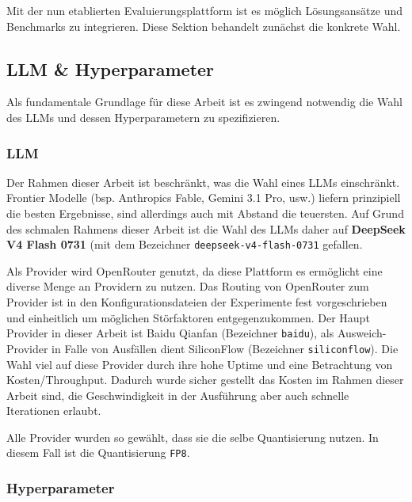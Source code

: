 Mit der nun etablierten Evaluierungsplattform ist es möglich Lösungsansätze und Benchmarks zu integrieren. Diese Sektion behandelt zunächst die konkrete Wahl.



\subsection{LLM \& Hyperparameter}\label{ch:Versuchsaufbau:LLMs}

Als fundamentale Grundlage für diese Arbeit ist es zwingend notwendig die Wahl des LLMs und dessen Hyperparametern zu spezifizieren. 

\subsubsection{LLM}\label{ch:Versuchsaufbau:LLMs:LLM}

Der Rahmen dieser Arbeit ist beschränkt, was die Wahl eines LLMs einschränkt. Frontier Modelle (bsp. Anthropics Fable, Gemini 3.1 Pro, usw.) liefern prinzipiell die besten Ergebnisse, sind allerdings auch mit Abstand die teuersten. Auf Grund des schmalen Rahmens dieser Arbeit ist die Wahl des LLMs daher auf \textbf{DeepSeek V4 Flash 0731} (mit dem Bezeichner \texttt{deepseek-v4-flash-0731} gefallen.

Als Provider wird OpenRouter genutzt, da diese Plattform es ermöglicht eine diverse Menge an Providern zu nutzen. Das Routing von OpenRouter zum Provider ist in den Konfigurationsdateien der Experimente fest vorgeschrieben und einheitlich um möglichen Störfaktoren entgegenzukommen. Der Haupt Provider in dieser Arbeit ist Baidu Qianfan (Bezeichner \texttt{baidu}), als Ausweich-Provider in Falle von Ausfällen dient SiliconFlow (Bezeichner \texttt{siliconflow}). Die Wahl viel auf diese Provider durch ihre hohe Uptime und eine Betrachtung von Kosten/Throughput. Dadurch wurde sicher gestellt das Kosten im Rahmen dieser Arbeit sind, die Geschwindigkeit in der Ausführung aber auch schnelle Iterationen erlaubt.

Alle Provider wurden so gewählt, dass sie die selbe Quantisierung nutzen. In diesem Fall ist die Quantisierung \texttt{FP8}.

\subsubsection{Hyperparameter}\label{ch:Versuchsaufbau:LLMs:Hyperparameter}

